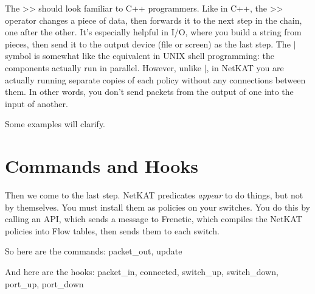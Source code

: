 \bigskip

The >> should look familiar to C++ programmers. 
Like in C++, the >> operator changes a piece of data, then forwards it to the next step in the chain, one
after the other.
It's especially helpful in I/O, where you build a string from pieces, then send it to the output device (file or screen) as the
last step.
The $\vert$ symbol is somewhat like the equivalent in UNIX shell programming: the components actually run in parallel.
However, unlike $\vert$, in NetKAT you are actually running separate copies of each policy without any connections
between them.
In other words, you don't send packets from the output of one into the input of another.

Some examples will clarify.

\section{Commands and Hooks}

Then we come to the last step.
NetKAT predicates \textit{appear} to do things, but not by themselves.
You must install them as policies on your switches.  
You do this by calling an API, which sends a message to Frenetic, which compiles the NetKAT policies
into Flow tables, then sends them to each switch.

So here are the commands: packet_out, update

And here are the hooks: packet_in, connected, switch_up, switch_down, port_up, port_down